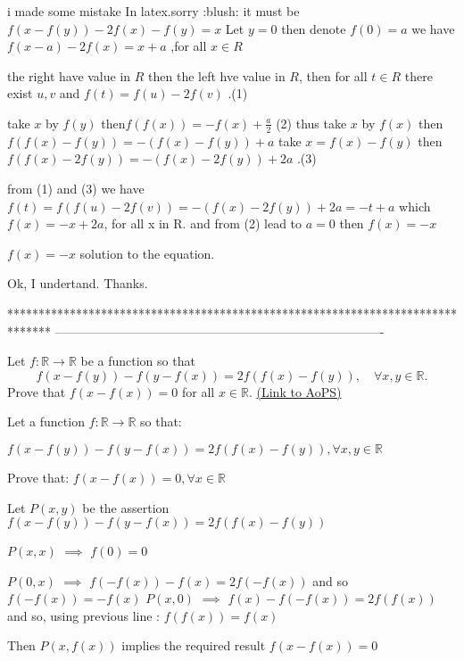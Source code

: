 \begin{solution}
	\begin{tcolorbox}i made some mistake In latex.sorry :blush: 
it must be $ f(x - f(y)) - 2f(x) - f(y) = x$
Let $ y = 0$ then denote $ f(0) = a$ we have $ f(x - a) - 2f(x) = x + a$ ,for all $ x\in R$

the right have value in $ R$ then the left hve value in $ R$, then for all $ t \in R$ there exist $ u,v$ and $ f(t) = f(u) - 2f(v)$                                              .(1)

take $ x$ by $ f(y)$ then$ f(f(x)) = - f(x) + \frac {a}{2}$   (2)
thus take $ x$ by $ f(x)$ then $ f(f(x) - f(y)) = - (f(x) - f(y)) + a$
take $ x = f(x) - f(y)$ then $ f(f(x) - 2f(y)) = - (f(x) - 2f(y)) + 2a$    .(3)

from (1) and (3) we have $ f(t) = f(f(u) - 2f(v)) = - (f(x) - 2f(y)) + 2a = - t + a$
which $ f(x) = - x + 2a$, for all x in R. and from (2) lead to $ a = 0$ then $ f(x) = - x$

$ f(x) = - x$ solution to the equation.\end{tcolorbox}

Ok, I undertand.
Thanks.
\end{solution}
*******************************************************************************
-------------------------------------------------------------------------------

\begin{problem}
	Let $ f: \mathbb{R}\to\mathbb{R}$ be a function so that
\[f(x - f(y)) - f(y - f(x)) = 2f(f(x) - f(y)), \quad \forall x,y \in \mathbb{R}.\]
Prove that $ f(x - f(x)) = 0$ for all $x \in \mathbb{R}$.
	\flushright \href{https://artofproblemsolving.com/community/c6h313557}{(Link to AoPS)}
\end{problem}



\begin{solution}
	\begin{tcolorbox}Let a function $ f: \mathbb{R}\to\mathbb{R}$ so that:

${ f(x - f(y)) - f(y - f(x)) = 2f(f(x) - f(y)),\forall x,y \in \mathbb{R}}$

Prove that:
$ f(x - f(x)) = 0,\forall x \in \mathbb{R}$\end{tcolorbox}

Let $ P(x,y)$ be the assertion $ f(x - f(y)) - f(y - f(x)) = 2f(f(x) - f(y))$

$ P(x,x)$ $ \implies$ $ f(0) = 0$

$ P(0,x)$ $ \implies$ $ f( - f(x)) - f(x) = 2f( - f(x))$ and so $ f( - f(x)) = - f(x)$
$ P(x,0)$ $ \implies$ $ f(x) - f( - f(x)) = 2f(f(x))$ and so, using previous line : $ f(f(x)) = f(x)$

Then $ P(x,f(x))$ implies the required result $ f(x - f(x)) = 0$
\end{solution}



